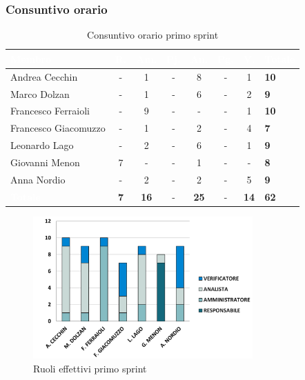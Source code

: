 \subsubsection{Consuntivo orario}
{
\setlength{\tabcolsep}{10pt}
\renewcommand{\arraystretch}{1.5}
\begin{table}[h!]
    \centering
    \begin{tabularx}{\textwidth}{| l | c | c | c | c | c | c | X |}
        \hline
        \rowcolor{headerrow} \textbf{\textcolor{white}{Membro}} & \textbf{\textcolor{white}{R.}} & \textbf{\textcolor{white}{Am.}} & \textbf{\textcolor{white}{Pj.}} & \textbf{\textcolor{white}{An.}} & \textbf{\textcolor{white}{Pg.}} & \textbf{\textcolor{white}{V.}} & \textbf{\textcolor{white}{Totale}} \\
        \hline
        Andrea Cecchin & - & 1 & - & 8 & - & 1 & \textbf{10} \\
        \hline
        Marco Dolzan & - & 1 & - & 6 & - & 2 & \textbf{9} \\
        \hline
        Francesco Ferraioli & - & 9 & - & - & - & 1 & \textbf{10} \\
        \hline  
        Francesco Giacomuzzo & - & 1 & - & 2 & - & 4 & \textbf{7} \\
        \hline
        Leonardo Lago & - & 2 & - & 6 & - & 1 & \textbf{9} \\
        \hline
        Giovanni Menon & 7 & - & - & 1 & - & - & \textbf{8} \\
        \hline
        Anna Nordio & - & 2 & - & 2 & - & 5 & \textbf{9} \\
        \hline
    \cellcolor{headerrow} \textbf{\textcolor{white}{Totale}} & \textbf{7} & \textbf{16} & - & \textbf{25} & - & \textbf{14} & \textbf{62} \\
        \hline
    \end{tabularx} 
    \caption{Consuntivo orario primo sprint}
    \label{tab:consuntivoorarioprimosprint}
\end{table}
}

\begin{figure}[h!]
    \centering
    \includegraphics[width=0.75\textwidth]{cons1ruoli.png}
    \caption{Ruoli effettivi primo sprint}
    \label{fig:consuntivootarioprimosprint}
\end{figure}

